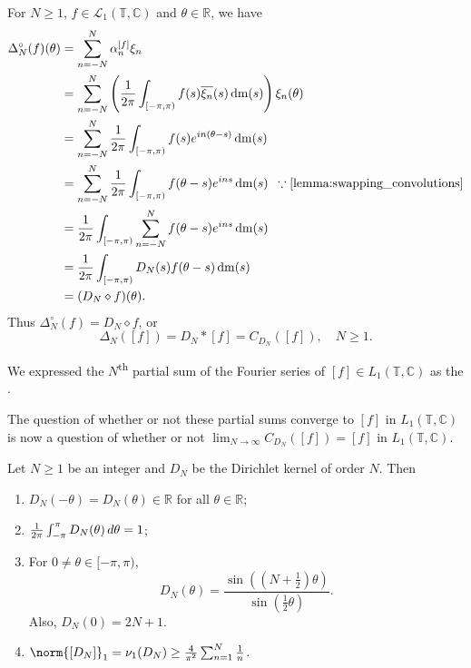 \documentclass[notoc,notitlepage]{tufte-book}
\DeclareMathOperator{\dm}{dm}
\begin{document}
For $N \geq 1$, $f \in \mathcal{L}_1(\mathbb{T}, \mathbb{C})$
and $\theta \in \mathbb{R}$, we have
\begin{align*}
  \Delta_N^\circ(f)(\theta)
  &= \sum_{n = -N}^{N} \alpha_n^{[f]} \xi_n \\
  &= \sum_{n=-N}^{N} \left( \frac{1}{2\pi} \int_{[-\pi, \pi)}
      f(s) \overline{\xi_n}(s) \dm(s) \right) \xi_n(\theta) \\
  &= \sum_{n=-N}^{N} \frac{1}{2\pi} \int_{[-\pi, \pi)} f(s) e^{in(\theta - s)} \dm(s) \\
  &= \sum_{n=-N}^{N} \frac{1}{2\pi} \int_{[-\pi, \pi)} f(\theta - s) e^{ins} \dm(s)
      \enspace \because \text{\cref{lemma:swapping_convolutions}} \\
  &= \frac{1}{2\pi} \int_{[-\pi, \pi)} \sum_{n=-N}^{N}
    f(\theta - s) e^{ins} \dm(s) \\
  &= \frac{1}{2\pi} \int_{[-\pi ,\pi)} D_N(s) f(\theta - s) \dm(s) \\
  &= (D_N \diamond f)(\theta).
\end{align*}
Thus $\Delta_N^\circ(f) = D_N \diamond f$, or
\begin{equation*}
  \Delta_N([f]) = D_N * [f] = C_{D_N}([f]), \quad N \geq 1.
\end{equation*}

We expressed the $N$\textsuperscript{th} partial sum of the Fourier series
of $[f] \in L_1(\mathbb{T}, \mathbb{C})$ as the
.

The question of whether or not these partial sums converge to $[f]$
in $L_1(\mathbb{T}, \mathbb{C})$ is now a question of
whether or not $\lim_{N \to \infty} C_{D_N}([f]) = [f]$ in
$L_1(\mathbb{T}, \mathbb{C})$.

\begin{thm}\label{thm:properties_of_the_dirichlet_kernel}
  Let $N \geq 1$ be an integer and $D_N$ be the
  Dirichlet kernel of order $N$. Then
  \begin{enumerate}
    \item $D_N(-\theta) = D_N(\theta) \in \mathbb{R}$ for all $\theta \in \mathbb{R}$;
    \item $\frac{1}{2\pi} \int_{-\pi}^{\pi} D_N(\theta) \mathop{}\!d{\theta} = 1$;
    \item For $0 \neq \theta \in [-\pi, \pi)$,
      \begin{equation*}
        D_N(\theta) = \frac{\sin(\left(N + \frac{1}{2}\right)\theta)}
                      {\sin \left( \frac{1}{2} \theta \right)}.
      \end{equation*}
      Also, $D_N(0) = 2N + 1$.
    \item $\norm{[D_N]}_1 = \nu_1(D_N) \geq \frac{4}{\pi^2} \sum_{n=1}^{N} \frac{1}{n}$.
  \end{enumerate}
\end{thm}
\end{document}
